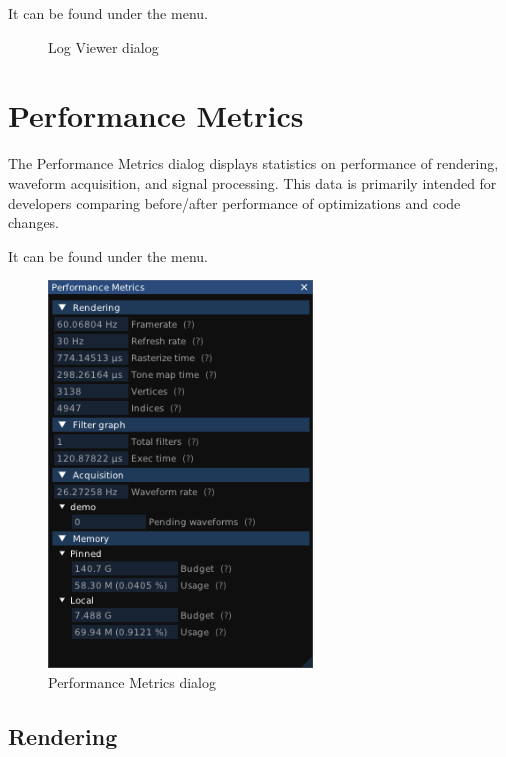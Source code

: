 It can be found under the  menu.

\begin{figure}[H]
\centering
{}
\caption{Log Viewer dialog}
\label{fig:logviewer}
\end{figure}


\section{Performance Metrics}
\label{dlg:perfmetrics}

The Performance Metrics dialog displays statistics on performance of rendering, waveform acquisition, and signal
processing. This data is primarily intended for developers comparing before/after performance of optimizations and code
changes.

It can be found under the  menu.

\begin{figure}[H]
\centering
\includegraphics[width=7cm]{ng-images/dialog-perfmetrics.png}
\caption{Performance Metrics dialog}
\label{fig:perfmetrics}
\end{figure}

\subsection{Rendering}

